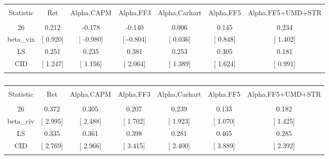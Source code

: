 \documentclass[16pt]{article}
\begin{document}
\begin{table}[!htbp] \centering 
  \caption{} 
  \label{} 
\begin{tabular}{@{\extracolsep{5pt}} ccccccc} 
\\[-1.8ex]\hline 
\hline \\[-1.8ex] 
Statistic & Ret & Alpha,CAPM & Alpha,FF3 & Alpha,Carhart & Alpha,FF5 & Alpha,FF5+UMD+STR \\ 
\hline \\[-1.8ex] 
26 & 0.212 & -0.178 & -0.140 & 0.006 & 0.145 & 0.234 \\ 
beta\_vix & [ 0.920] & [ -0.980] & [ -0.804] & [ 0.036] & [ 0.848] & [ 1.402] \\ 
LS & 0.251 & 0.235 & 0.381 & 0.253 & 0.305 & 0.181 \\ 
CID & [ 1.247] & [ 1.156] & [ 2.064] & [ 1.389] & [ 1.624] & [ 0.991] \\ 
\hline \\[-1.8ex] 
\end{tabular} 
\end{table}

\begin{table}[!htbp] \centering 
  \caption{} 
  \label{} 
\begin{tabular}{@{\extracolsep{5pt}} ccccccc} 
\\[-1.8ex]\hline 
\hline \\[-1.8ex] 
Statistic & Ret & Alpha,CAPM & Alpha,FF3 & Alpha,Carhart & Alpha,FF5 & Alpha,FF5+UMD+STR \\ 
\hline \\[-1.8ex] 
26 & 0.372 & 0.305 & 0.207 & 0.239 & 0.133 & 0.182 \\ 
beta\_civ & [ 2.995] & [ 2.488] & [ 1.702] & [ 1.923] & [ 1.070] & [ 1.425] \\ 
LS & 0.335 & 0.361 & 0.398 & 0.281 & 0.465 & 0.285 \\ 
CID & [ 2.769] & [ 2.966] & [ 3.415] & [ 2.400] & [ 3.889] & [ 2.392] \\ 
\hline \\[-1.8ex] 
\end{tabular} 
\end{table}
\end{document}

